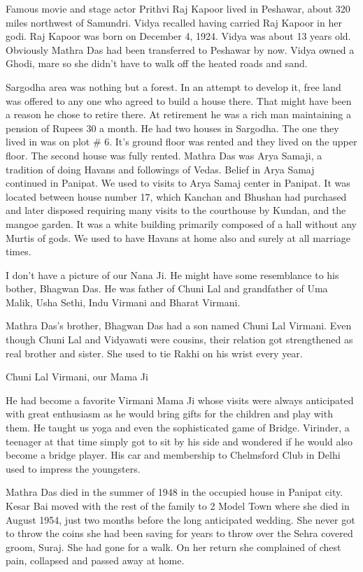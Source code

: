 Famous movie and stage actor Prithvi Raj Kapoor lived in Peshawar, about 320 miles northwest of Samundri. Vidya recalled having carried Raj Kapoor in her godi. Raj Kapoor was born on December 4, 1924. Vidya was about 13 years old. Obviously Mathra Das had been transferred to Peshawar by now. Vidya owned a Ghodi, mare so she didn’t have to walk off the heated roads and sand. 

Sargodha area was nothing but a forest. In an attempt to develop it, free land was offered to any one who agreed to build a house there. That might have been a reason he chose to retire there. At retirement he was a rich man maintaining a pension of Rupees 30 a month. He had two houses in Sargodha. The one they lived in was on plot  # 6. It's ground floor was rented and they lived on the upper floor. The second house was fully rented. Mathra Das was Arya Samaji, a tradition of doing Havans and followings of Vedas. Belief in Arya Samaj continued in Panipat. We used to visits to Arya Samaj center in Panipat. It was located between house number 17, which Kanchan and Bhushan had purchased and later disposed requiring many visits to the courthouse by Kundan, and the mangoe garden. It was a white building primarily composed of a hall without any Murtis of gods. We used to have Havans at home also and surely at all marriage times. 

I don’t have a picture of our Nana Ji. He might have some resemblance to his bother, Bhagwan Das. He was father of Chuni Lal and grandfather of Uma Malik, Usha Sethi, Indu Virmani and Bharat Virmani. 
 
Mathra Das's brother, Bhagwan Das had a son named Chuni Lal Virmani. Even though Chuni Lal and Vidyawati were cousins, their relation got strengthened as real brother and sister. She used to tie Rakhi on his wrist every year. 

 
Chuni Lal Virmani, our Mama Ji

He had become a favorite Virmani Mama Ji whose visits were always anticipated with great enthusiasm as he would bring gifts for the children and play with them. He taught us yoga and even the sophisticated game of Bridge. Virinder, a teenager at that time simply got to sit by his side and wondered if he would also become a bridge player. His car and membership to Chelmsford Club in Delhi used to impress the youngsters. 


Mathra Das died in the summer of 1948 in the occupied house in Panipat city. Kesar Bai moved with the rest of the family to 2 Model Town where she died in August 1954, just two months before the long anticipated wedding. She never got to throw the coins she had been saving for years to throw over the Sehra covered groom, Suraj. She had gone for a walk. On her return she complained of chest pain, collapsed and passed away at home. 


